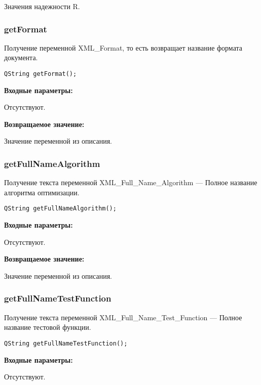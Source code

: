 \documentclass[a4paper,12pt]{article}
\begin{document}
Значения надежности R.


\subsubsection{getFormat}\label{getFormat}

Получение переменной XML\_Format, то есть возвращает название формата документа.


\begin{lstlisting}[label=code_syntax_getFormat,caption=Синтаксис]
QString getFormat();
\end{lstlisting}

\textbf{Входные параметры:}

Отсутствуют.

\textbf{Возвращаемое значение:}

Значение переменной из описания.


\subsubsection{getFullNameAlgorithm}\label{getFullNameAlgorithm}

Получение текста переменной  XML\_Full\_Name\_Algorithm --- Полное название алгоритма оптимизации.


\begin{lstlisting}[label=code_syntax_getFullNameAlgorithm,caption=Синтаксис]
QString getFullNameAlgorithm();
\end{lstlisting}

\textbf{Входные параметры:}

Отсутствуют.

\textbf{Возвращаемое значение:}

Значение переменной из описания.


\subsubsection{getFullNameTestFunction}\label{getFullNameTestFunction}

Получение текста переменной  XML\_Full\_Name\_Test\_Function --- Полное название тестовой функции.


\begin{lstlisting}[label=code_syntax_getFullNameTestFunction,caption=Синтаксис]
QString getFullNameTestFunction();
\end{lstlisting}

\textbf{Входные параметры:}

Отсутствуют.
\end{document}
